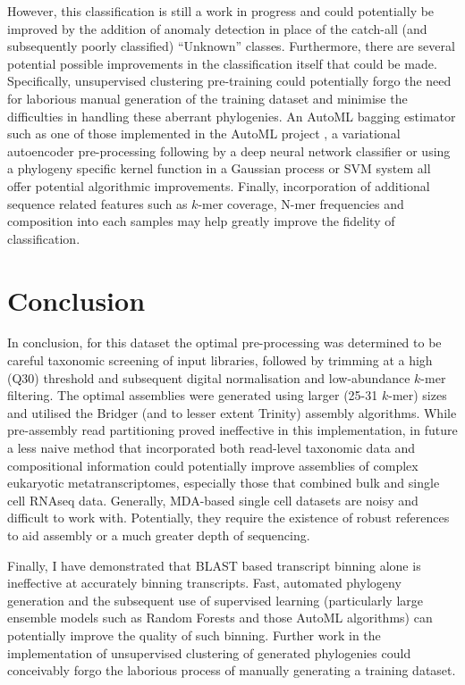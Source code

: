 However, this classification
is still a work in progress and could potentially be improved by the 
addition of anomaly detection in place of the catch-all (and subsequently poorly classified)
``Unknown'' classes.  Furthermore, there are several potential possible improvements
in the classification itself that could be made.
Specifically, unsupervised clustering pre-training could potentially
forgo the need for laborious manual generation of the training dataset and minimise 
the difficulties in handling these aberrant phylogenies.
An AutoML bagging estimator such as one of those implemented in the AutoML project \citep{Eggensperger2013}, 
a variational autoencoder pre-processing following by a 
deep neural network classifier or using a phylogeny specific kernel 
function \citep{Vert2002} in a Gaussian process or
SVM system all offer potential algorithmic improvements.
Finally, incorporation of additional sequence related features such as
\(k\)-mer coverage, N-mer frequencies and composition into each samples may help greatly improve
the fidelity of classification.

\section{Conclusion}
In conclusion, for this dataset the optimal pre-processing
was determined to be careful taxonomic screening of input libraries,
followed by trimming at a high (Q30) threshold and subsequent
digital normalisation and low-abundance \(k\)-mer filtering. 
The optimal assemblies were generated using larger (25-31 \(k\)-mer)
sizes and utilised the Bridger (and to lesser extent Trinity)
assembly algorithms.  While pre-assembly read partitioning proved 
ineffective in this implementation, in future a less naive
method that incorporated both read-level taxonomic data and
compositional information could potentially improve assemblies of 
complex eukaryotic metatranscriptomes, especially those that
combined bulk and single cell RNAseq data.  Generally,
MDA-based single cell datasets are noisy and difficult to work with.
Potentially, they require the existence of robust references to aid
assembly or a much greater depth of sequencing.

Finally, I have demonstrated that BLAST based transcript binning alone is
ineffective at accurately binning transcripts. Fast, automated phylogeny generation
and the subsequent use of supervised learning (particularly
large ensemble models such as Random Forests and those AutoML algorithms)
can potentially improve the quality of such binning.  Further work 
in the implementation of unsupervised clustering of generated phylogenies
could conceivably forgo the laborious process of manually generating
a training dataset.

